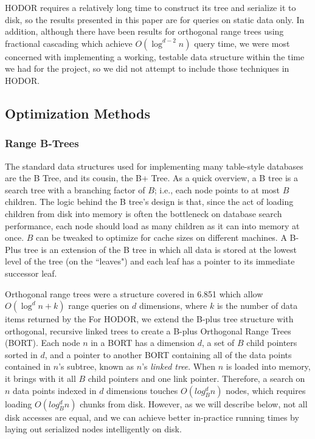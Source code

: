 \documentclass[11pt, oneside]{article}
\begin{document}
HODOR requires a relatively long time to construct its tree and serialize it
to disk, so the results presented in this paper are for queries on static data
only. In addition, although there have been results for orthogonal range trees
using fractional cascading which achieve $O(\log^{d-2} n)$ query time, we were
most concerned with implementing a working, testable data structure within the
time we had for the project, so we did not attempt to include those techniques
in HODOR.

\subsection{Optimization Methods}
\subsubsection{Range B-Trees}

The standard data structures used for implementing many table-style databases
are the B Tree, and its cousin, the B+ Tree. As a quick overview, a B tree is a
search tree with a branching factor of $B$; i.e., each node points to at most
$B$ children. The logic behind the B tree's design is that, since the act of
loading children from disk into memory is often the bottleneck on database
search performance, each node should load as many children as it can into memory
at once. $B$ can be tweaked to optimize for cache sizes on different machines.
A B-Plus tree is an extension of the B tree in which all data is stored at the
lowest level of the tree (on the ``leaves") and each leaf has a pointer to its
immediate successor leaf. 

Orthogonal range trees were a structure covered in 6.851 which allow $O(\log^d
n + k)$ range queries on $d$ dimensions, where $k$ is the number of data items
returned by the  For HODOR, we extend the B-plus tree
structure with orthogonal, recursive linked trees to create a B-plus Orthogonal
Range Trees (BORT). Each node $n$ in a BORT has a dimension $d$, a set of $B$
child pointers sorted in $d$, and a pointer to another BORT containing all of
the data points contained in $n$'s subtree, known as $n$'s \textit{linked tree}.
When $n$ is loaded into memory, it brings with it all $B$ child pointers and one
link pointer. Therefore, a search on $n$ data points indexed in $d$ dimensions
touches $O(log^d_B n)$ nodes, which requires loading $O(log^d_B n)$ chunks from
disk. However, as we will describe below, not all disk accesses are equal, and
we can achieve better in-practice running times by laying out serialized nodes
intelligently on disk.
\end{document}
